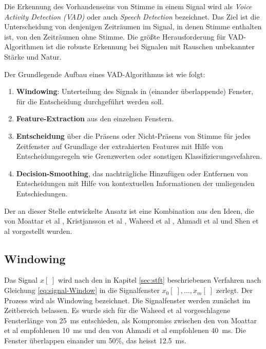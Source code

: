 Die Erkennung des Vorhandenseins von Stimme in einem Signal wird als \emph{Voice Activity Detection (VAD)} oder auch \emph{Speech Detection} bezeichnet. Das Ziel ist die Unterscheidung von denjenigen Zeiträumen im Signal, in denen Stimme enthalten ist, von den Zeiträumen ohne Stimme. Die größte Herausforderung für VAD-Algorithmen ist die robuste Erkennung bei Signalen mit Rauschen unbekannter Stärke und Natur. \cite[S. 1]{vad_kola} \cite[S. 1]{vad_Lisboa}

Der Grundlegende Aufbau eines VAD-Algorithmus ist wie folgt:
\begin{enumerate}
	\item \textbf{Windowing}: Unterteilung des Signals in (einander überlappende) Fenster, für die Entscheidung durchgeführt werden soll.
	\item \textbf{Feature-Extraction} aus den einzelnen Fenstern.
	\item \textbf{Entscheidung} über die Präsens oder Nicht-Präsens von Stimme für jedes Zeitfenster auf Grundlage der extrahierten Features mit Hilfe von Entscheidungsregeln wie Grenzwerten oder sonstigen Klassifizierungsvefahren.
	\item \textbf{Decision-Smoothing}, das nachträgliche Hinzufügen oder Entfernen von Entscheidungen mit Hilfe von kontextuellen Informationen der umliegenden Entschiedungen.\cite[S. 8 - 9]{vad_granada} \cite[S. 1 - 2]{vad_kola}
\end{enumerate}

Der an dieser Stelle entwickelte Ansatz ist eine Kombination aus den Ideen, die von  Moattar et al \cite{vad_Easy}, Kristjansson et al \cite{vad_Lisboa}, Waheed et al \cite{vad_entropy}, Ahmadi et al \cite{vad_ceps} und Shen et al\cite{vad_entropie02} vorgestellt wurden. 

\subsection{Windowing}
\label{sec:windowing}

Das Signal $x[\;]$ wird nach den in Kapitel \ref{sec:stft} beschriebenen Verfahren nach Gleichung \ref{eq:signal-Window} in die Signalfenster $x_0[\;] , \ldots , x_m[\;]$ zerlegt. Der Prozess wird als \glqq Windowing\grqq{} bezeichnet. Die Signalfenster werden zunächst im Zeitbereich belassen. Es wurde sich für die Waheed et al \cite{vad_entropy} vorgeschlagene Fensterlänge von \SI{25}{\milli\second} entschieden, als Kompromiss zwischen den von Moattar et al\cite{vad_Easy} empfohlenen \SI{10}{\milli\second} und den von Ahmadi et al \cite{vad_ceps} empfohlenen \SI{40}{\milli\second}. Die Fenster überlappen einander um 50\%, das heisst \SI{12.5}{\milli\second}.

